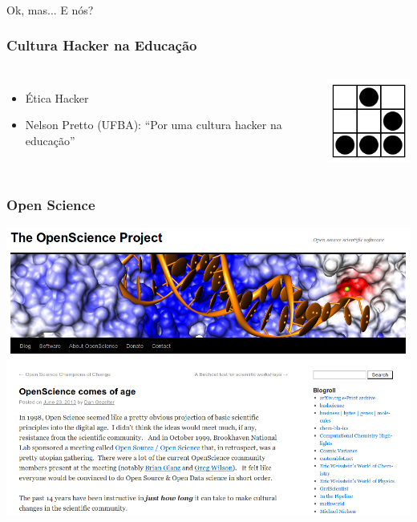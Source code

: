 \documentclass{beamer}
\begin{document}
\begin{frame}
  \frametitle{}
  \begin{center}
    Ok, mas... E nós?
  \end{center}
\end{frame}

\begin{frame}
  \frametitle{Cultura Hacker na Educação}
  \begin{columns}
    \column{8cm}
    \begin{itemize}
    \item Ética Hacker
    \item Nelson Pretto (UFBA): ``Por uma cultura hacker na educação''
    \end{itemize}
    \column{3cm}
    \includegraphics[width=3cm]{glider.png}
  \end{columns}
\end{frame}

\begin{frame}
   \frametitle{Open Science}
   \begin{center}
     \includegraphics[width=\textwidth]{openscience.png}
   \end{center}
\end{frame}
\end{document}
